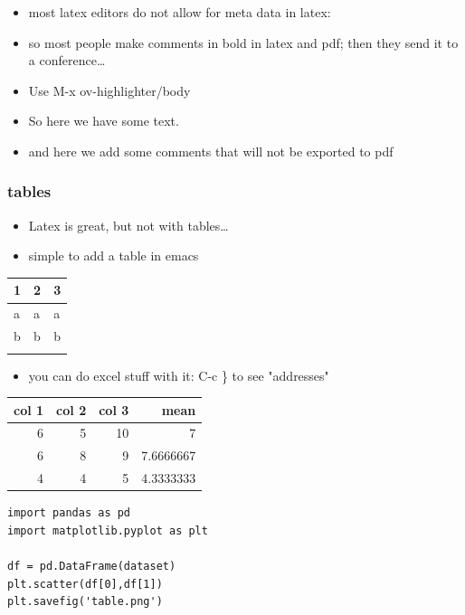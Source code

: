 \documentclass[11pt]{article}
\begin{document}
\begin{itemize}
\item most latex editors do not allow for meta data in latex:
\item so most people make comments in bold in latex and pdf; then they send it to a conference\ldots{}
\item Use M-x ov-highlighter/body
\item So here we have some text.
\item and here we add some comments that will not be exported to pdf
\end{itemize}

\subsubsection*{tables}
\label{sec:org6f1774d}

\begin{itemize}
\item Latex is great, but not with tables\ldots{}
\item simple to add a table in emacs
\end{itemize}

\begin{center}
\begin{tabular}{lll}
1 & 2 & 3\\
\hline
a & a & a\\
b & b & b\\
 &  & \\
\end{tabular}
\end{center}

\begin{itemize}
\item you can do excel stuff with it: C-c \} to see "addresses"
\end{itemize}

\begin{center}
\label{data}
\begin{tabular}{rrrr}
col 1 & col 2 & col 3 & mean\\
\hline
6 & 5 & 10 & 7\\
6 & 8 & 9 & 7.6666667\\
4 & 4 & 5 & 4.3333333\\
\end{tabular}
\end{center}


\begin{verbatim}
import pandas as pd
import matplotlib.pyplot as plt

df = pd.DataFrame(dataset)
plt.scatter(df[0],df[1])
plt.savefig('table.png')
\end{verbatim}
\end{document}
